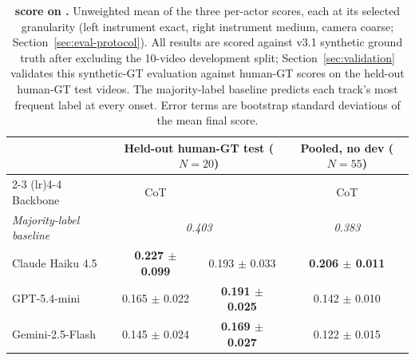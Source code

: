 \begin{table}[t]
\centering
\small
\setlength{\tabcolsep}{7pt}
\renewcommand{\arraystretch}{1.15}
\begin{tabular}{l cc c}
\toprule
& \multicolumn{2}{c}{\textbf{Held-out human-GT test} ($N=20$)} & \textbf{Pooled, no dev} ($N=55$) \\
\cmidrule(lr){2-3} \cmidrule(lr){4-4}
Backbone & CoT & \surgent{} & CoT \\
\midrule
\multicolumn{1}{l}{\textit{Majority-label baseline}} & \multicolumn{2}{c}{\textit{0.403}} & \textit{0.383} \\
\midrule
Claude Haiku 4.5   & \textbf{0.227 {\scriptsize $\pm$ 0.099}} & 0.193 {\scriptsize $\pm$ 0.033} & \textbf{0.206 {\scriptsize $\pm$ 0.011}} \\
GPT-5.4-mini       & 0.165 {\scriptsize $\pm$ 0.022} & \textbf{0.191 {\scriptsize $\pm$ 0.025}} & 0.142 {\scriptsize $\pm$ 0.010} \\
Gemini-2.5-Flash   & 0.145 {\scriptsize $\pm$ 0.024} & \textbf{0.169 {\scriptsize $\pm$ 0.027}} & 0.122 {\scriptsize $\pm$ 0.015} \\
\bottomrule
\end{tabular}
\caption{\textbf{\actionrec{} score on \cvsact{}.} Unweighted mean of the
three per-actor scores, each at its selected granularity (left instrument
exact, right instrument medium, camera coarse; Section~\ref{sec:eval-protocol}).
All results are scored against v3.1 synthetic ground truth after excluding the
10-video development split; Section~\ref{sec:validation} validates this
synthetic-GT evaluation against human-GT scores on the held-out human-GT test
videos. The majority-label baseline predicts each track's most frequent label at every
onset. Error terms are bootstrap standard deviations of the mean final score.}
\label{tab:cvsact_main}
\end{table}
